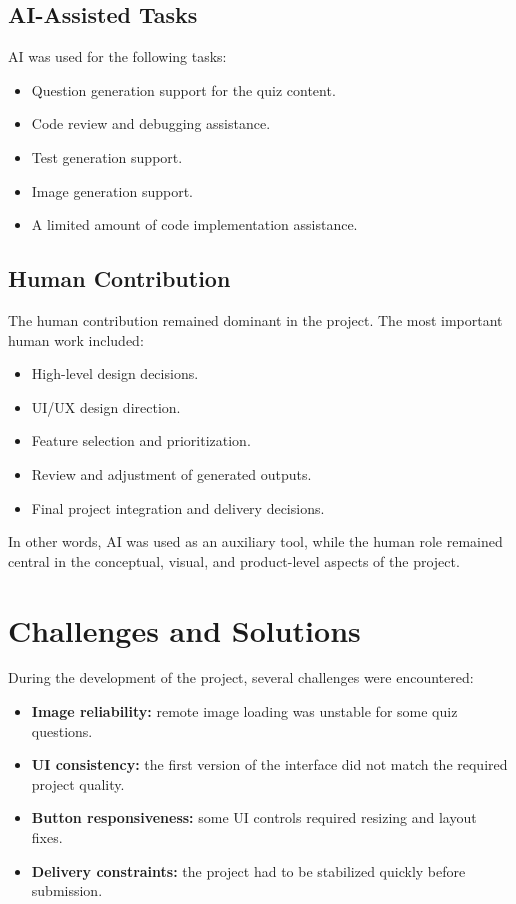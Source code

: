 \documentclass[12pt,a4paper]{article}
\begin{document}
\subsection{AI-Assisted Tasks}
AI was used for the following tasks:

\begin{itemize}[leftmargin=1.5em]
    \item Question generation support for the quiz content.
    \item Code review and debugging assistance.
    \item Test generation support.
    \item Image generation support.
    \item A limited amount of code implementation assistance.
\end{itemize}

\subsection{Human Contribution}
The human contribution remained dominant in the project. The most important human work included:

\begin{itemize}[leftmargin=1.5em]
    \item High-level design decisions.
    \item UI/UX design direction.
    \item Feature selection and prioritization.
    \item Review and adjustment of generated outputs.
    \item Final project integration and delivery decisions.
\end{itemize}

In other words, AI was used as an auxiliary tool, while the human role remained central in the conceptual, visual, and product-level aspects of the project.

\section{Challenges and Solutions}
During the development of the project, several challenges were encountered:

\begin{itemize}[leftmargin=1.5em]
    \item \textbf{Image reliability:} remote image loading was unstable for some quiz questions.
    \item \textbf{UI consistency:} the first version of the interface did not match the required project quality.
    \item \textbf{Button responsiveness:} some UI controls required resizing and layout fixes.
    \item \textbf{Delivery constraints:} the project had to be stabilized quickly before submission.
\end{itemize}
\end{document}
